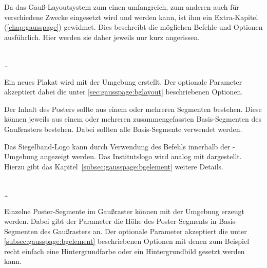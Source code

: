 Da das Gauß-Layoutsystem zum einen umfangreich, zum anderen auch für verschiedene Zwecke eingesetzt wird und werden kann, ist ihm ein Extra-Kapitel (\ref{chap:gausspage})
gewidmet.
Dies beschreibt die möglichen Befehle und Optionen ausführlich.
Hier werden sie daher jeweils nur kurz angerissen.


\begin{Declaration}
    \\
  \quad\dots\\
\end{Declaration}

Ein neues Plakat wird mit der Umgebung  erstellt.
Der optionale Parameter  akzeptiert dabei die
unter \ref{sec:gausspage:bglayout} beschriebenen Optionen.

Der Inhalt des Posters sollte aus einem oder mehreren Segmenten bestehen.
Diese können jeweils aus einem oder mehreren zusammengefassten Basis-Segmenten
des Gaußrasters bestehen. Dabei sollten alle Basis-Segmente verwendet werden.

\begin{sloppypar}
Das Siegelband-Logo kann durch Verwendung des Befehls 
innerhalb der -Umgebung angezeigt werden.
Das Institutslogo wird analog mit 
dargestellt. Hierzu gibt das Kapitel~\ref{subsec:gausspage:bgelement}
weitere Details.
\end{sloppypar}

\begin{Declaration}
    \\
  \quad\dots\\
\end{Declaration}

Einzelne Poster-Segmente im Gaußraster können mit der Umgebung
 erzeugt werden.
Dabei gibt der Parameter  die Höhe des
Poster-Segments in Basis-Segmenten des Gaußrasters an.
Der optionale Parameter  akzeptiert die
unter \ref{subsec:gausspage:bgelement} beschriebenen Optionen mit
denen zum Beispiel recht einfach eine Hintergrundfarbe oder ein Hintergrundbild
gesetzt werden kann.


